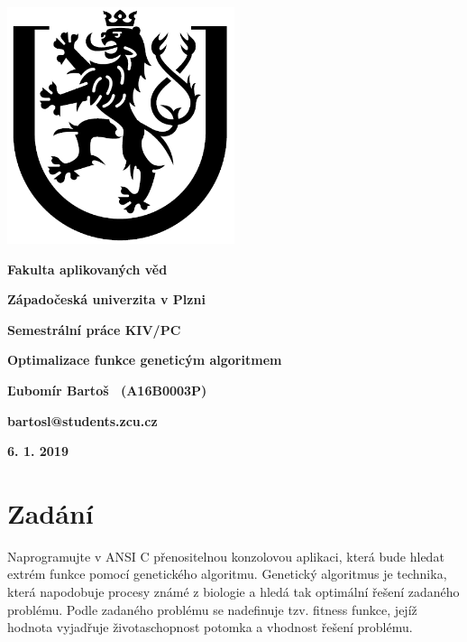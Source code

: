 \documentclass{article}
\begin{document}
  




\centerline{\includegraphics[width=0.5\textwidth]{logo}}

\vspace{50px}



\centerline{{\LARGE \textbf{Fakulta aplikovaných věd}}}
\centerline{{\Large \textbf{Západočeská univerzita v Plzni}}}
\vspace{50px}



\centerline{{\LARGE \textbf{Semestrální práce KIV/PC}}}
\centerline{{\Large \textbf{Optimalizace funkce geneticým algoritmem}}}

\vspace*{\fill}


\hspace*{\fill} \textbf{Ľubomír Bartoš \ (A16B0003P)}

\hspace*{\fill} \textbf{bartosl@students.zcu.cz}

\hspace*{\fill} \textbf{6. 1. 2019}



\newpage







\tableofcontents
\newpage

\section{Zadání}
\setlength{\parindent}{10ex}
Naprogramujte v ANSI C přenositelnou konzolovou aplikaci, která bude hledat extrém funkce pomocí genetického algoritmu. Genetický algoritmus je technika, která napodobuje procesy známé z biologie a hledá tak optimální řešení zadaného problému. Podle zadaného problému se nadefinuje tzv. fitness funkce, jejíž hodnota vyjadřuje životaschopnost potomka a vhodnost řešení problému.
\end{document}
